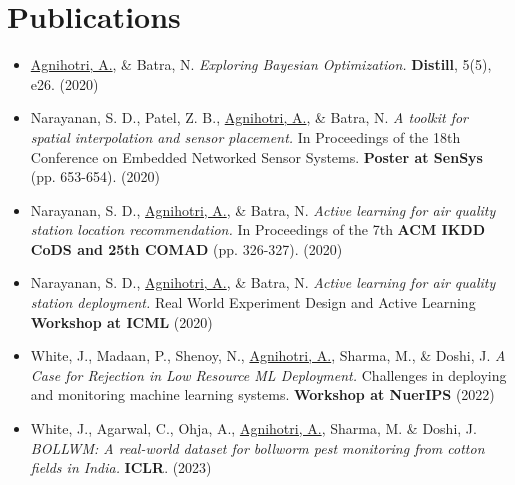 \section{Publications}

\begin{itemize}\itemsep1pt \parskip0pt 
\item \underline{Agnihotri, A.}, \& Batra, N. \textit{Exploring Bayesian Optimization.} \textbf{Distill}, 5(5), e26. (2020)

\item Narayanan, S. D., Patel, Z. B., \underline{Agnihotri, A.}, \& Batra, N. \textit{A toolkit for spatial interpolation and sensor placement.} In Proceedings of the 18th Conference on Embedded Networked Sensor Systems. \textbf{Poster at SenSys} (pp. 653-654). (2020)

\item Narayanan, S. D., \underline{Agnihotri, A.}, \& Batra, N. \textit{Active learning for air quality station location recommendation.} In Proceedings of the 7th \textbf{ACM IKDD CoDS and 25th COMAD} (pp. 326-327). (2020)

\item Narayanan, S. D., \underline{Agnihotri, A.}, \& Batra, N. \textit{Active learning for air quality station deployment.} Real World Experiment Design and Active Learning \textbf{Workshop at ICML} (2020)

\item White, J., Madaan, P., Shenoy, N., \underline{Agnihotri, A.}, Sharma, M., \& Doshi, J. \textit{A Case for Rejection in Low Resource ML Deployment.} Challenges in deploying and monitoring machine learning systems. \textbf{Workshop at NuerIPS} (2022)

\item White, J., Agarwal, C., Ohja, A., \underline{Agnihotri, A.}, Sharma, M. \&  Doshi, J. \textit{BOLLWM: A real-world dataset for bollworm pest monitoring from cotton fields in India.} \textbf{ICLR}. (2023)

\end{itemize}
